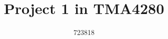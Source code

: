 \documentclass[a4paper,11pt]{report}
\begin{document}
\title{Project 1 in TMA4280}
\author{723818}
\maketitle



%
%
%
%
%
%
%
%
%
\end{document}
